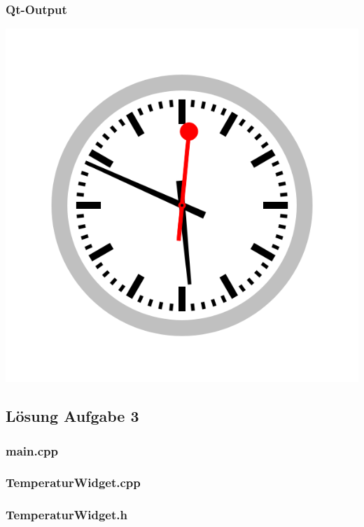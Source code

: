 \subsubsection{Qt-Output}
\begin{center}
	\includegraphics[scale=.5]{./images/u14a2.png}
\end{center}

\subsection{Lösung Aufgabe 3}
\subsubsection{main.cpp}

\subsubsection{TemperaturWidget.cpp}

\subsubsection{TemperaturWidget.h}


